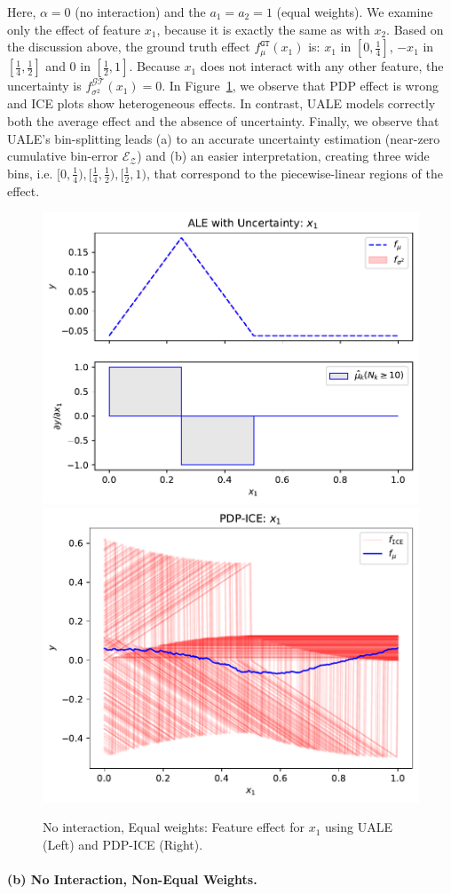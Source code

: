 \documentclass[twoside]{article}
\begin{document}
Here, \(\alpha=0\) (no interaction) and the \(a_1=a_2=1\) (equal
weights). We examine only the effect of feature \(x_1\), because it is
exactly the same as with \(x_2\). Based on the discussion above, the
ground truth effect \(f_\mu^{\mathtt{GT}}(x_1)\) is: \(x_1\) in
\([0, \frac{1}{4}]\), \(-x_1\) in \([\frac{1}{4}, \frac{1}{2}]\) and
\(0\) in \([\frac{1}{2}, 1]\). Because \(x_1\) does not interact with
any other feature, the uncertainty is
\(f^{\mathcal{GT}}_{\sigma^2}(x_1) = 0\). In
Figure~\ref{fig:synth-ex-1-case-1}, we observe that PDP effect is
wrong and ICE plots show heterogeneous effects. In contrast, UALE
models correctly both the average effect and the absence of
uncertainty. Finally, we observe that UALE's bin-splitting leads (a)
to an accurate uncertainty estimation (near-zero cumulative bin-error
\(\mathcal{E}_{\mathcal{Z}}\)) and (b) an easier interpretation,
creating three wide bins, i.e.
\([0, \frac{1}{4}), [\frac{1}{4}, \frac{1}{2}), [\frac{1}{2}, 1)\),
that correspond to the piecewise-linear regions of the effect.


\begin{figure}[h]
  \centering
  \includegraphics[width=.23\textwidth]{example_1/dale_feat_0.pdf}
  \includegraphics[width=.23\textwidth]{example_1/pdp_ice_feat_0.pdf}
  \caption{No interaction, Equal weights: Feature effect for \(x_1\)
    using UALE (Left) and PDP-ICE (Right).}
  \label{fig:synth-ex-1-case-1}
\end{figure}

\paragraph{(b) No Interaction, Non-Equal Weights.}
\end{document}

